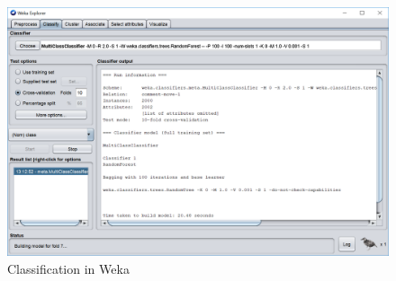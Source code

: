 \documentclass[article,type=msc,colorback,accentcolor=tud7b]{tudthesis}
\begin{document}
    \begin{figure}[H]
      \centering
      \includegraphics[scale=0.3]{images/weka_classify}
      \caption{Classification in Weka}
      \label{fig:weka_classify}
	\end{figure}
	
\end{document}
